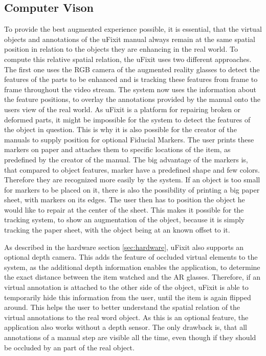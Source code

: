 \subsection{Computer Vison}
To provide the best augmented experience possible, it is essential, that the virtual objects and annotations of the uFixit manual always remain at the same spatial position in relation to the objects they are enhancing in the real world. To compute this relative spatial relation, the uFixit uses two different approaches. The first one uses the RGB camera of the augmented reality glasses to detect the features of the parts to be enhanced and is tracking these features from frame to frame throughout the video stream. The system now uses the information about the feature positions, to overlay the annotations provided by the manual onto the users view of the real world.
As uFixit is a platform for repairing broken or deformed parts, it might be impossible for the system to detect the features of the object in question. This is why it is also possible for the creator of the manuals to supply position for optional Fiducial Markers. The user prints these markers on paper and attaches them to specific locations of the item, as predefined by the creator of the manual.
The big advantage of the markers is, that compared to object features, marker have a predefined shape and few colors. Therefore they are recognized more easily by the system. If an object is too small for markers to be placed on it, there is also the possibility of printing a big paper sheet, with markers on its edges. The user then has to position the object he would like to repair at the center of the sheet. This makes it possible for the tracking system, to show an augmentation of the object, because it is simply tracking the paper sheet, with the object being at an known offset to it.

As described in the hardware section \ref{sec:hardware}, uFixit also supports an optional depth camera. This adds the feature of occluded virtual elements to the system, as the additional depth information enables the application, to determine the exact distance between the item watched and the AR glasses. Therefore, if an virtual annotation is attached to the other side of the object, uFixit is able to temporarily hide this information from the user, until the item is again flipped around. This helps the user to better understand the spatial relation of the virtual annotations to the real word object.
As this is an optional feature, the application also works without a depth sensor. The only drawback is, that all annotations of a manual step are visible all the time, even though if they should be occluded by an part of the real object.

